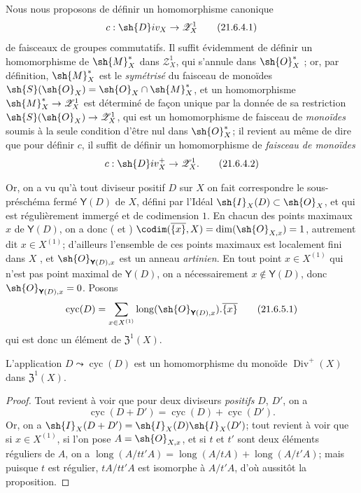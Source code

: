\begin{env}[21.6.4]
\label{IV.21.6.4}
Nous nous proposons de définir un homomorphisme canonique
\[
\label{IV.21.6.4.1}
  c:\sh{D}iv_X\to\mathscr{Z}_X^1
  \tag{21.6.4.1}
\]
de faisceaux de groupes commutatifs.
Il suffit évidemment de définir un homomorphisme de $\sh{M}_X^*$ dans $\mathscr{Z}_X^1$, qui s'annule dans $\sh{O}_X^*$ ;
or, par définition, $\sh{M}_X^*$ est le \emph{symétrisé} du faisceau de monoïdes $\sh{S}(\sh{O}_X)=\sh{O}_X\cap\sh{M}_X^*$, et un homomorphisme $\sh{M}_X^*\to\mathscr{Z}_X^1$ est déterminé de façon unique par la donnée de sa restriction $\sh{S}(\sh{O}_X)\to\mathscr{Z}_X^1$, qui est un homomorphisme de faisceau de \emph{monoïdes} soumis à la seule condition d'être nul dans $\sh{O}_X^*$;
il revient au même de dire que pour définir $c$, il suffit de définir un homomorphisme de \emph{faisceau de monoïdes}
\[
\label{IV.21.6.4.2}
  c:\sh{D}iv_X^+\to\mathscr{Z}_X^1.
  \tag{21.6.4.2}
\]
\end{env}

\begin{env}[21.6.5]
\label{IV.21.6.5}
Or, on a vu qu'à tout diviseur positif $D$ sur $X$ on fait correspondre le sous-préschéma fermé $\boldsymbol{\mathsf{Y}}(D)$ de $X$, défini par l'Idéal $\sh{I}_X(D)\subset\sh{O}_X$, et qui est régulièrement immergé et de codimension $1$.
En chacun des points maximaux $x$ de $\boldsymbol{\mathsf{Y}}(D)$, on a donc ( et ) $\codim(\overline{\{x\}},X)=\dim(\sh{O}_{X,x})=1$, autrement dit $x\in X^{(1)}$;
d'ailleurs l'ensemble de ces points maximaux est localement fini dans $X$ , et $\sh{O}_{\boldsymbol{\mathsf{Y}}(D),x}$ est un anneau \emph{artinien}.
En tout point $x\in X^{(1)}$ qui n'est pas point maximal de $\boldsymbol{\mathsf{Y}}(D)$, on a nécessairement $x\notin\boldsymbol{\mathsf{Y}}(D)$, donc $\sh{O}_{\boldsymbol{\mathsf{Y}}(D),x}=0$.
Posons
\[
\label{IV.21.6.5.1}
  \operatorname{cyc}(D)=\sum_{x\in X^{(1)}}\operatorname{long}(\sh{O}_{\boldsymbol{\mathsf{Y}}(D),x}).\overline{\{x\}}
  \tag{21.6.5.1}
\]
qui est donc un élément de $\mathfrak{Z}^1(X)$.
\end{env}

\begin{proposition}[21.6.6]
\label{IV.21.6.6}
L'application $D\leadsto\operatorname{cyc}(D)$ est un homomorphisme du monoïde $\operatorname{Div}^+(X)$ dans $\mathfrak{Z}^1(X)$.
\end{proposition}

\begin{proof}
Tout revient à voir que pour deux diviseurs \emph{positifs} $D$, $D'$, on a
\[
  \operatorname{cyc}(D+D')=\operatorname{cyc}(D)+\operatorname{cyc}(D').
\]
Or, on a  $\sh{I}_X(D+D')=\sh{I}_X(D)\sh{I}_X(D')$;
tout revient à voir que si $x\in X^{(1)}$, si l'on pose $A=\sh{O}_{X,x}$, et si $t$ et $t'$ sont deux éléments réguliers de $A$, on a $\operatorname{long}(A/tt'A)=\operatorname{long}(A/tA)+\operatorname{long}(A/t'A)$;
mais puisque $t$ est régulier, $tA/tt'A$ est isomorphe à $A/t'A$, d'où aussitôt la proposition.
\end{proof}

